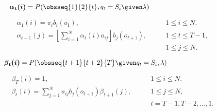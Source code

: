 \begin{equation}
\boldsymbol{\alpha_t(i)} = P(\obsseq{1}{2}{t}, q_t = S_i \given \lambda)
\hspace{9.8em}\label{eq:fw:forw}
\end{equation}

\begin{align}
\alpha_1(i) = \pi_i b_i(o_1),\qquad &1 \leq i \leq N.
\label{eq:fw:forw:init} \\
\alpha_{t+1}(j) = [\sum_{i=1}^N \alpha_t(i) a_{ij}] b_j(o_{t+1}),
\qquad &1 \leq t \leq T - 1, \nonumber \\
&1 \leq j \leq N.\label{eq:fw:forw:loop}
\end{align}

\begin{equation}
\boldsymbol{\beta_t(i)} = P(\obsseq{t+1}{t+2}{T} \given q_t = S_i, \lambda)
\hspace{8em}\label{eq:fw:back}
\end{equation}

\begin{align}
\beta_T(i) = 1,\qquad &1 \leq i \leq N.
\label{eq:fw:back:init} \\
\beta_{t}(i) = \sum_{j=1}^N a_{ij} b_j(o_{t+1}) \beta_{t+1}(j),\qquad
&1 \leq j \leq N, \nonumber \\
&t = T-1, T-2, \dots, 1.
\label{eq:fw:back:loop}
\end{align}
